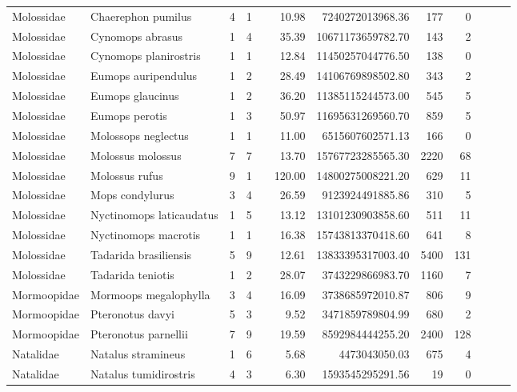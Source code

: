 \begin{landscape}
\begin{longtable}{@{}llrrrrrrrrrr@{}}
  Molossidae & Chaerephon pumilus &   4 &   1 &  & 10.98 & 7240272013968.36 & 177 &   0 &  &  &  \\ 
  Molossidae & Cynomops abrasus &   1 &   4 &  & 35.39 & 10671173659782.70 & 143 &   2 &  &  &  \\ 
  Molossidae & Cynomops planirostris &   1 &   1 &  & 12.84 & 11450257044776.50 & 138 &   0 &  &  &  \\ 
  Molossidae & Eumops auripendulus &   1 &   2 &  & 28.49 & 14106769898502.80 & 343 &   2 &  &  &  \\ 
  Molossidae & Eumops glaucinus &   1 &   2 &  & 36.20 & 11385115244573.00 & 545 &   5 &  &  &  \\ 
  Molossidae & Eumops perotis &   1 &   3 &  & 50.97 & 11695631269560.70 & 859 &   5 &  &  &  \\ 
  Molossidae & Molossops neglectus &   1 &   1 &  & 11.00 & 6515607602571.13 & 166 &   0 &  &  &  \\ 
  Molossidae & Molossus molossus &   7 &   7 &  & 13.70 & 15767723285565.30 & 2220 &  68 &  &  &  \\ 
  Molossidae & Molossus rufus &   9 &   1 &  & 120.00 & 14800275008221.20 & 629 &  11 &  &  &  \\ 
  Molossidae & Mops condylurus &   3 &   4 &  & 26.59 & 9123924491885.86 & 310 &   5 &  &  &  \\ 
  Molossidae & Nyctinomops laticaudatus &   1 &   5 &  & 13.12 & 13101230903858.60 & 511 &  11 &  &  &  \\ 
  Molossidae & Nyctinomops macrotis &   1 &   1 &  & 16.38 & 15743813370418.60 & 641 &   8 &  &  &  \\ 
  Molossidae & Tadarida brasiliensis &   5 &   9 &  & 12.61 & 13833395317003.40 & 5400 & 131 &  &  &  \\ 
  Molossidae & Tadarida teniotis &   1 &   2 &  & 28.07 & 3743229866983.70 & 1160 &   7 &  &  &  \\ 
  Mormoopidae & Mormoops megalophylla &   3 &   4 &  & 16.09 & 3738685972010.87 & 806 &   9 &  &  &  \\ 
  Mormoopidae & Pteronotus davyi &   5 &   3 &  & 9.52 & 3471859789804.99 & 680 &   2 &  &  &  \\ 
  Mormoopidae & Pteronotus parnellii &   7 &   9 &  & 19.59 & 8592984444255.20 & 2400 & 128 &  &  &  \\ 
  Natalidae & Natalus stramineus &   1 &   6 &  & 5.68 & 4473043050.03 & 675 &   4 &  &  &  \\ 
  Natalidae & Natalus tumidirostris &   4 &   3 &  & 6.30 & 1593545295291.56 &  19 &   0 &  &  &  \\ 

\end{longtable}
\end{landscape}
